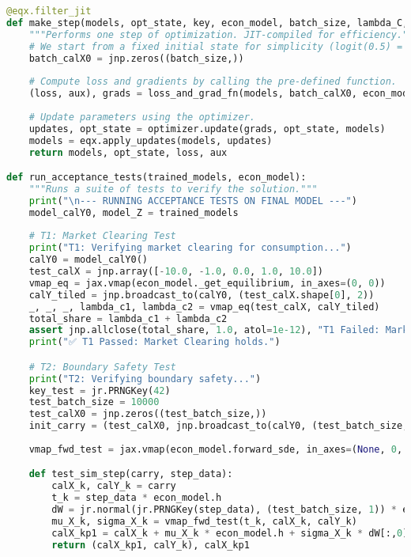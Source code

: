 \begin{lstlisting}[language=Python, caption={C.5: Training Loop, JIT-compiled Step, and Acceptance Tests.}, label={lst:jax_training_app_appendix}]
@eqx.filter_jit
def make_step(models, opt_state, key, econ_model, batch_size, lambda_C, optimizer):
    """Performs one step of optimization. JIT-compiled for efficiency."""
    # We start from a fixed initial state for simplicity (logit(0.5) = 0).
    batch_calX0 = jnp.zeros((batch_size,))
    
    # Compute loss and gradients by calling the pre-defined function.
    (loss, aux), grads = loss_and_grad_fn(models, batch_calX0, econ_model, key, lambda_C)
    
    # Update parameters using the optimizer.
    updates, opt_state = optimizer.update(grads, opt_state, models)
    models = eqx.apply_updates(models, updates)
    return models, opt_state, loss, aux

def run_acceptance_tests(trained_models, econ_model):
    """Runs a suite of tests to verify the solution."""
    print("\n--- RUNNING ACCEPTANCE TESTS ON FINAL MODEL ---")
    model_calY0, model_Z = trained_models
    
    # T1: Market Clearing Test
    print("T1: Verifying market clearing for consumption...")
    calY0 = model_calY0()
    test_calX = jnp.array([-10.0, -1.0, 0.0, 1.0, 10.0])
    vmap_eq = jax.vmap(econ_model._get_equilibrium, in_axes=(0, 0))
    calY_tiled = jnp.broadcast_to(calY0, (test_calX.shape[0], 2))
    _, _, _, lambda_c1, lambda_c2 = vmap_eq(test_calX, calY_tiled)
    total_share = lambda_c1 + lambda_c2
    assert jnp.allclose(total_share, 1.0, atol=1e-12), "T1 Failed: Market clearing!"
    print("✅ T1 Passed: Market Clearing holds.")

    # T2: Boundary Safety Test
    print("T2: Verifying boundary safety...")
    key_test = jr.PRNGKey(42)
    test_batch_size = 10000
    test_calX0 = jnp.zeros((test_batch_size,))
    init_carry = (test_calX0, jnp.broadcast_to(calY0, (test_batch_size, 2)))
    
    vmap_fwd_test = jax.vmap(econ_model.forward_sde, in_axes=(None, 0, 0))

    def test_sim_step(carry, step_data):
        calX_k, calY_k = carry
        t_k = step_data * econ_model.h
        dW = jr.normal(jr.PRNGKey(step_data), (test_batch_size, 1)) * econ_model.sqrt_h
        mu_X_k, sigma_X_k = vmap_fwd_test(t_k, calX_k, calY_k)
        calX_kp1 = calX_k + mu_X_k * econ_model.h + sigma_X_k * dW[:,0]
        return (calX_kp1, calY_k), calX_kp1


\end{lstlisting}
